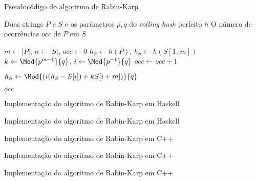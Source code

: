 \begin{frame}[fragile]{Pseudocódigo do algoritmo de Rabin-Karp}

    \begin{algorithm}[H]
        \caption{Algoritmo de Rabin-Karp com \textit{hash} perfeito}
        \begin{algorithmic}[1]
            \Require Duas strings $P$ e $S$ e os parâmetros $p, q$ do \textit{rolling hash} perfeito $h$
            \Ensure O número de ocorrências $occ$ de $P$ em $S$

                \State $m \gets |P|$, $n \gets |S|$, $occ \gets 0$
                \State $h_P \gets h(P)$, $h_S \gets h(S[1..m])$
                \State $k \gets \Mod{p^{m - 1}}{q}$, $i \gets \Mod{p^{-1}}{q}$
                \State
                        \State $occ \gets occ + 1$
                    \EndIf

                        \State $h_S \gets \Mod{\left(i(h_S - S[i]) + kS[i + m]\right)}{q}$
                    \EndIf
                \EndFor

                \State \Return $occ$
            \EndFunction
        \end{algorithmic}
    \end{algorithm}

\end{frame}

\begin{frame}[fragile]{Implementação do algoritmo de Rabin-Karp em Haskell}
\end{frame}

\begin{frame}[fragile]{Implementação do algoritmo de Rabin-Karp em Haskell}
\end{frame}

\begin{frame}[fragile]{Implementação do algoritmo de Rabin-Karp em C++}
\end{frame}

\begin{frame}[fragile]{Implementação do algoritmo de Rabin-Karp em C++}
\end{frame}

\begin{frame}[fragile]{Implementação do algoritmo de Rabin-Karp em C++}
\end{frame}


